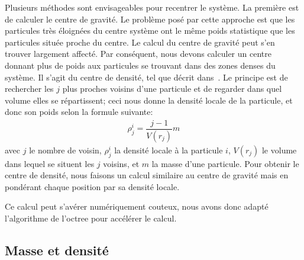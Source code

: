 			Plusieurs méthodes sont envisageables pour recentrer le système. La première est de calculer le
			centre de gravité. Le problème posé par cette approche est que les particules très éloignées du
			centre système ont le même poids statistique que les particules située proche du centre.
			Le calcul du centre de gravité peut s'en trouver largement affecté.
			Par conséquent, nous devons calculer un centre donnant plus de poids aux
			particules se trouvant dans des zones denses du système. Il s'agit du \og centre de densité\fg,
			tel que décrit dans~\citet{1985ApJ...298...80C}. Le principe est de rechercher les $j$ plus
			proches voisins d'une particule et de regarder dans quel volume elles se répartissent; ceci nous
			donne la densité locale de la particule, et donc son poids selon la formule suivante:
			\begin{align}
				\rho_j^i = \dfrac{j-1}{V(r_j)}m
			\end{align}
			avec $j$ le nombre de voisin, $\rho_j^i$ la densité locale à la particule $i$, $V(r_j)$ le volume
			dans lequel se situent les $j$ voisins, et $m$ la masse d'une particule. Pour obtenir le centre
			de densité,
			nous faisons un calcul similaire au centre de gravité mais en pondérant chaque position par sa densité locale.

			Ce calcul peut s'avérer numériquement couteux, nous avons  donc adapté l'algorithme de l'octree
			pour accélérer le calcul.

		\subsection{Masse et densité}


